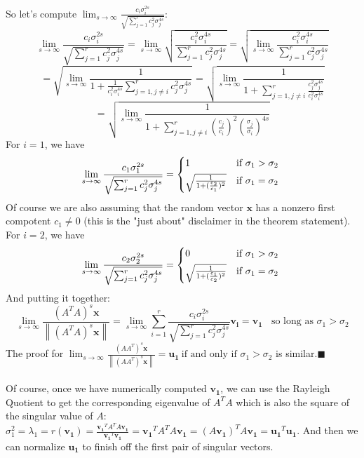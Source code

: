 \documentclass{tufte-handout}
\newcommand{\norm}[1]{\left\lVert#1\right\rVert}
\renewcommand{\qedsymbol}{$\blacksquare$}
\begin{document}
So let's compute $\lim_{s\rightarrow\infty}\frac{c_i\sigma_{i}^{2s}}{\sqrt{\sum_{j=1}^rc_j^2\sigma_{j}^{4s}}}$:
\[\lim_{s\rightarrow\infty}\frac{c_i\sigma_{i}^{2s}}{\sqrt{\sum_{j=1}^rc_j^2\sigma_{j}^{4s}}}
=
\lim_{s\rightarrow\infty}\sqrt{\frac{c_i^2\sigma_{i}^{4s}}{\sum_{j=1}^rc_j^2\sigma_{j}^{4s}}}
=
\sqrt{\lim_{s\rightarrow\infty}\frac{c_i^2\sigma_{i}^{4s}}{\sum_{j=1}^rc_j^2\sigma_{j}^{4s}}}
\]
\[
=
\sqrt{\lim_{s\rightarrow\infty}\frac{1}{1+\frac{1}{c_i^2\sigma_{i}^{4s}}\sum_{j=1,j\ne i}^rc_j^2\sigma_{j}^{4s}}}
=
\sqrt{\lim_{s\rightarrow\infty}\frac{1}{1+\sum_{j=1,j\ne i}^r\frac{c_j^2\sigma_{j}^{4s}}{c_i^2\sigma_{i}^{4s}}}}
\]
\[
=
\sqrt{\lim_{s\rightarrow\infty}\frac{1}{1+\sum_{j=1,j\ne i}^r(\frac{c_j}{c_i})^2(\frac{\sigma_{j}}{\sigma_{i}})^{4s}}}
\]
For $i=1$, we have
\[
\lim_{s\rightarrow\infty}\frac{c_1\sigma_{1}^{2s}}{\sqrt{\sum_{j=1}^rc_j^2\sigma_{j}^{4s}}}
=\begin{cases*}
1&if $\sigma_{1}>\sigma_{2}$\\
\sqrt{\frac{1}{1+(\frac{c_2}{c_1})^2}}&if $\sigma_{1}=\sigma_{2}$
\end{cases*}
\]
Of course we are also assuming that the random vector $\mathbf{x}$ has a nonzero first compotent $c_1\ne0$ (this is the "just about" disclaimer in the theorem statement). For $i=2$, we have
\[
\lim_{s\rightarrow\infty}\frac{c_2\sigma_{2}^{2s}}{\sqrt{\sum_{j=1}^rc_j^2\sigma_{j}^{4s}}}
=\begin{cases*}
0&if $\sigma_{1}>\sigma_{2}$\\
\sqrt{\frac{1}{1+(\frac{c_1}{c_2})^2}}&if $\sigma_{1}=\sigma_{2}$
\end{cases*}
\]
And putting it together:
\[
\lim_{s\rightarrow\infty}\frac{(A^TA)^s\mathbf{x}}{\norm{(A^TA)^s\mathbf{x}}}
=
\lim_{s\rightarrow\infty}\sum_{i=1}^r\frac{c_i\sigma_{i}^{2s}}{\sqrt{\sum_{j=1}^rc_j^2\sigma_{j}^{4s}}}\mathbf{v_i}
=\mathbf{v_1}~~~~\text{so long as }\sigma_{1}>\sigma_{2}
\]
The proof for $\lim_{s\rightarrow\infty}\frac{(AA^T)^s\mathbf{x}}{\norm{(AA^T)^s\mathbf{x}}}
=\mathbf{u_1}~\text{if and only if }\sigma_{1}>\sigma_{2}$ is similar.\quad\qedsymbol\\\leavevmode\\
\noindent Of course, once we have numerically computed $\mathbf{v_1}$, we can use the Rayleigh Quotient to get the corresponding eigenvalue of $A^TA$ which is also the square of the singular value of $A$: $\sigma_{1}^2=\lambda_1=r(\mathbf{v_1})=\frac{\mathbf{v_1
}^TA^TA\mathbf{v_1}}{\mathbf{v_1}^T\mathbf{v_1}}=\mathbf{v_1
}^TA^TA\mathbf{v_1}=(A\mathbf{v_1})^TA\mathbf{v_1}=\mathbf{u_1}^T\mathbf{u_1}$. And then we can normalize $\mathbf{u_1}$ to finish off the first pair of singular vectors.\\\leavevmode\\
\end{document}

